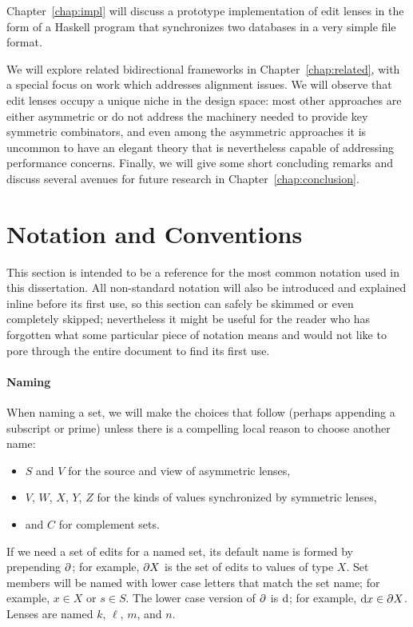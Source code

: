 \ifimpl
Chapter~\ref{chap:impl} will discuss a prototype implementation of edit
lenses in the form of a Haskell program that synchronizes two databases in a
very simple file format.
\fi%

We will explore related bidirectional frameworks in
Chapter~\ref{chap:related}, with a special focus on work which addresses
alignment issues. We will observe that edit lenses occupy a unique niche in
the design space: most other approaches are either asymmetric or do not
address the machinery needed to provide key symmetric combinators, and even
among the asymmetric approaches it is uncommon to have an elegant theory
that is nevertheless capable of addressing performance concerns.
Finally, we will give some short concluding remarks and discuss several
avenues for future research in Chapter~\ref{chap:conclusion}.

\section{Notation and Conventions}
\label{sec:notation}
This section is intended to be a reference for the most common notation used
in this dissertation. All non-standard notation will also be introduced and
explained inline before its first use, so this section can safely be skimmed
or even completely skipped; nevertheless it might be useful for the reader
who has forgotten what some particular piece of notation means and would not
like to pore through the entire document to find its first use.

\paragraph*{Naming}
When naming a set, we will make the choices that follow (perhaps appending a
subscript or prime) unless there is a compelling local reason to choose
another name:
\begin{itemize}
    \item $S$ and $V$ for the source and view of asymmetric lenses,
    \item $V$, $W$, $X$, $Y$, $Z$ for the kinds of values synchronized by
        symmetric lenses,
    \item and $C$ for complement sets.
\end{itemize}
If we need a set of edits for a named set, its default name is formed by
prepending $\partial$; for example, $\partial X$ is the set of edits to values of type
$X$. Set members will be named with lower case letters that match the set
name; for example, $x \in X$ or $s \in S$. The lower case version of $\partial$ is
$\textrm{d}$; for example, $\textrm{d} x \in \partial X$. Lenses are named $k$, $\ell$, $m$, and
$n$.

